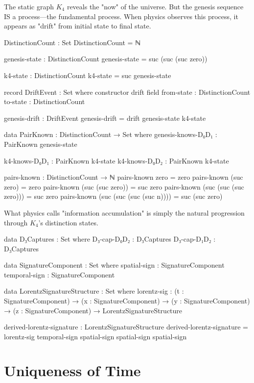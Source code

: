 \documentclass[11pt,a4paper]{book}
\begin{document}
The static graph $K_4$ reveals the "now" of the universe. But the genesis sequence IS a process—the fundamental process. When physics observes this process, it appears as "drift" from initial state to final state.

\begin{code}
DistinctionCount : Set
DistinctionCount = ℕ

genesis-state : DistinctionCount
genesis-state = suc (suc (suc zero))

k4-state : DistinctionCount
k4-state = suc genesis-state

record DriftEvent : Set where
  constructor drift
  field
    from-state : DistinctionCount
    to-state   : DistinctionCount

genesis-drift : DriftEvent
genesis-drift = drift genesis-state k4-state

data PairKnown : DistinctionCount → Set where
  genesis-knows-D₀D₁ : PairKnown genesis-state
  
  k4-knows-D₀D₁ : PairKnown k4-state
  k4-knows-D₀D₂ : PairKnown k4-state

pairs-known : DistinctionCount → ℕ
pairs-known zero = zero
pairs-known (suc zero) = zero
pairs-known (suc (suc zero)) = suc zero
pairs-known (suc (suc (suc zero))) = suc zero
pairs-known (suc (suc (suc (suc n)))) = suc (suc zero)
\end{code}

What physics calls "information accumulation" is simply the natural progression through $K_4$'s distinction states.

\begin{code}
data D₃Captures : Set where
  D₃-cap-D₀D₂ : D₃Captures
  D₃-cap-D₁D₂ : D₃Captures

data SignatureComponent : Set where
  spatial-sign  : SignatureComponent
  temporal-sign : SignatureComponent

data LorentzSignatureStructure : Set where
  lorentz-sig : (t : SignatureComponent) → 
                (x : SignatureComponent) → 
                (y : SignatureComponent) → 
                (z : SignatureComponent) → 
                LorentzSignatureStructure

derived-lorentz-signature : LorentzSignatureStructure
derived-lorentz-signature = lorentz-sig temporal-sign spatial-sign spatial-sign spatial-sign
\end{code}

\section{Uniqueness of Time}
\end{document}
